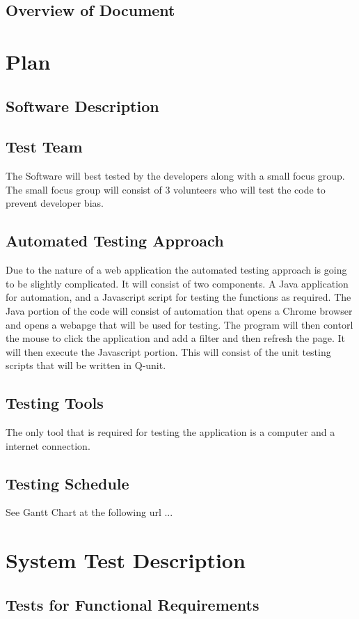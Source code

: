 \documentclass[12pt, titlepage]{article}
\begin{document}
\subsection{Overview of Document}
\section{Plan}
	
\subsection{Software Description}
\subsection{Test Team}
The Software will best tested by the developers along with a small focus group. The small focus group will consist of 3 volunteers who will test the code to prevent developer bias. 
\subsection{Automated Testing Approach}
Due to the nature of a web application the automated testing approach is going to be slightly complicated. It will consist of two components. A Java application for automation, and a Javascript script for testing the functions as required. The Java portion of the code will consist of automation that opens a Chrome browser and opens a webapge that will be used for testing. The program will then contorl the mouse to click the application and add a filter and then refresh the page. It will then execute the Javascript portion. This will consist of the unit testing scripts that will be written in Q-unit. 
\subsection{Testing Tools}
The only tool that is required for testing the application is a computer and a internet connection.
\subsection{Testing Schedule}
		
See Gantt Chart at the following url ...
\section{System Test Description}
	
\subsection{Tests for Functional Requirements}
\end{document}
